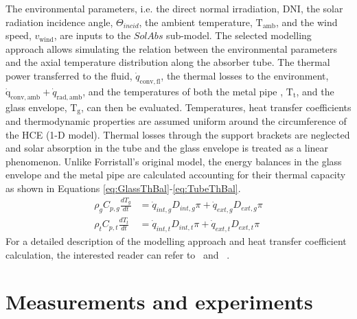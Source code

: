 \documentclass[final,3p,times,review]{elsarticle}
\begin{document}
%
The environmental parameters, i.e. the direct normal irradiation, DNI, the solar radiation incidence angle, $\Theta_{incid}$, the ambient temperature, $\mathrm{T}_\mathrm{amb}$, and the wind speed, $v_\mathrm{wind}$, are inputs to the $SolAbs$ sub-model. The selected modelling approach allows simulating the relation between the environmental parameters and the axial temperature distribution along the absorber tube. The thermal power transferred to the fluid, $\dot{q}_\mathrm{conv,fl}$, the thermal losses to the environment, $\mathrm{\dot{q}}_\mathrm{conv,amb} + \dot{q}_\mathrm{rad,amb}$, and the temperatures of both the metal pipe , $\mathrm{T}_\mathrm{t}$, and the glass envelope, $\mathrm{T}_\mathrm{g}$, can then be evaluated. Temperatures, heat transfer coefficients and thermodynamic properties are assumed uniform around the circumference of the HCE (1-D model). Thermal losses through the support brackets are neglected and  solar absorption in the tube and the glass envelope is treated as a linear phenomenon. Unlike Forristall's original model, the energy balances in the glass envelope and the metal pipe are calculated  accounting for their thermal capacity as shown in Equations \ref{eq:GlassThBal}-\ref{eq:TubeThBal}.
\begin{align}
\label{eq:GlassThBal}
\rho_g C_{p,g} \frac{d T_g}{dt} & = \dot{q}_{int,g} D_{int,g} \pi + \dot{q}_{ext,g} D_{ext,g} \pi \\
\label{eq:TubeThBal}
\rho_t C_{p,t} \frac{d T_t}{dt} & = \dot{q}_{int,t} D_{int,t} \pi + \dot{q}_{ext,t} D_{ext,t} \pi 
\end{align}
%
 For a detailed description of the modelling approach and heat transfer coefficient calculation, the interested reader can refer to~\cite{Forristall2003} and ~\cite{Desideri2016}. 


%
%
\section{Measurements and experiments} \label{Sec:Measurements}
\end{document}
